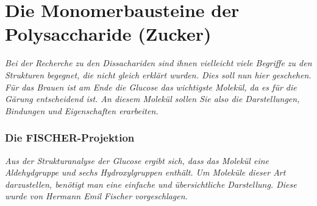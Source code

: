 \documentclass{scrartcl}  %
\begin{document}
\newpage	
	\part{Die Monomerbausteine der Polysaccharide (Zucker)}
	
		\textit{Bei der Recherche zu den Dissachariden sind ihnen vielleicht viele Begriffe zu den Strukturen begegnet, die nicht gleich erklärt wurden. Dies soll nun hier geschehen. Für das Brauen ist am Ende die Glucose das wichtigste Molekül, da es für die Gärung entscheidend ist. An diesem Molekül sollen Sie also die Darstellungen, Bindungen und Eigenschaften erarbeiten.} \newline

	\section{Die FISCHER-Projektion}

		\textit{Aus der Strukturanalyse der Glucose ergibt sich, dass das Molekül eine Aldehydgruppe und sechs Hydroxylgruppen enthält. Um Moleküle dieser Art darzustellen, benötigt man eine einfache und übersichtliche Darstellung. Diese wurde von Hermann Emil Fischer vorgeschlagen. } \newline
	
\end{document}
